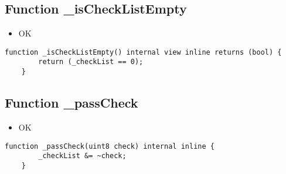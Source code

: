\subsection{Function \_{}isCheckListEmpty}

\begin{itemize}
\item OK
\end{itemize}

\begin{lstlisting}[firstnumber=9]
    function _isCheckListEmpty() internal view inline returns (bool) {
        return (_checkList == 0);
    }
\end{lstlisting}

\subsection{Function \_{}passCheck}

\begin{itemize}
\item OK
\end{itemize}

\begin{lstlisting}[firstnumber=6]
    function _passCheck(uint8 check) internal inline {
        _checkList &= ~check;
    }
\end{lstlisting}
